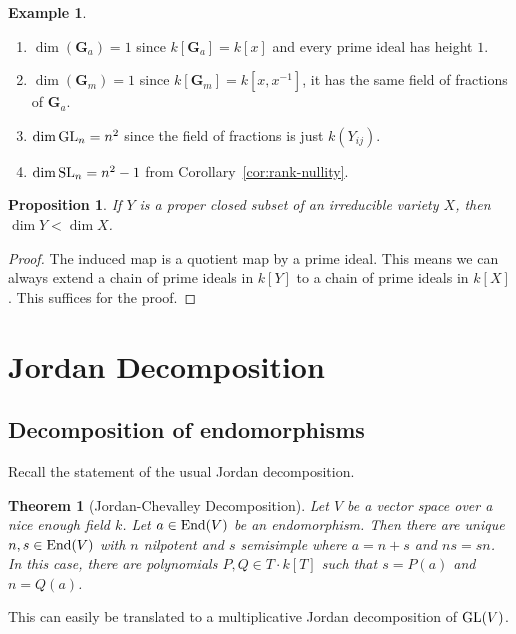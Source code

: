 \documentclass[]{pcmi}
\theoremstyle{plain}
\newtheorem{Proposition}[equation]{Proposition}
\newtheorem{Theorem}[equation]{Theorem}
\theoremstyle{definition}
\newtheorem{Example}[equation]{Example}
\begin{document}
\begin{Example}
    \phantom{h}
    \begin{enumerate}
        \item $\dim (\mathbf{G}_a) = 1$ since $k[\mathbf{G}_a] = k[x]$ and every prime ideal has height $1$. 
        \item $\dim (\mathbf{G}_m) = 1$ since $k[\mathbf{G}_m] = k[x, x^{-1}]$, it has the same field of fractions of $\mathbf{G}_a$. 
        \item $\dim \operatorname{GL}_n = n^2$ since the field of fractions is just $k(Y_{ij})$. 
        \item $\dim \operatorname{SL}_n = n^2 - 1$ from Corollary~\ref{cor:rank-nullity}. 
    \end{enumerate}
\end{Example}

\begin{Proposition}
    If $Y$ is a proper closed subset of an irreducible variety $X$, then $\dim Y < \dim X$. 
\end{Proposition}

\begin{proof}
    The induced map is a quotient map by a prime ideal. This means we can always extend a chain of prime ideals in $k[Y]$ to a chain of prime ideals in $k[X]$. This suffices for the proof. 
\end{proof}

\section{Jordan Decomposition}

\subsection{Decomposition of endomorphisms}

Recall the statement of the usual Jordan decomposition.

\begin{Theorem}[Jordan-Chevalley Decomposition]
    Let $V$ be a vector space over a nice enough field $k$. Let $a \in \operatorname{End}(V)$ be an endomorphism. Then there are unique $n, s \in \operatorname{End}(V)$ with $n$ nilpotent and $s$ semisimple where $a = n + s$ and $ns = sn$. In this case, there are polynomials $P, Q \in T \cdot k[T]$ such that $s = P(a)$ and $n = Q(a)$. 
\end{Theorem}

This can easily be translated to a multiplicative Jordan decomposition of $\operatorname{GL}(V)$. 
\end{document}
